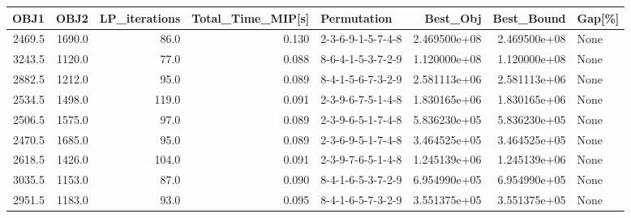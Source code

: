 \begin{tabular}{rrrrlrrl}
\toprule
   OBJ1 &    OBJ2 &  LP\_iterations &  Total\_Time\_MIP[s] &        Permutation &      Best\_Obj &    Best\_Bound & Gap[\%] \\
\midrule
 2469.5 &  1690.0 &           86.0 &              0.130 &  2-3-6-9-1-5-7-4-8 &  2.469500e+08 &  2.469500e+08 &   None \\
 3243.5 &  1120.0 &           77.0 &              0.088 &  8-6-4-1-5-3-7-2-9 &  1.120000e+08 &  1.120000e+08 &   None \\
 2882.5 &  1212.0 &           95.0 &              0.089 &  8-4-1-5-6-7-3-2-9 &  2.581113e+06 &  2.581113e+06 &   None \\
 2534.5 &  1498.0 &          119.0 &              0.091 &  2-3-9-6-7-5-1-4-8 &  1.830165e+06 &  1.830165e+06 &   None \\
 2506.5 &  1575.0 &           97.0 &              0.089 &  2-3-9-6-5-1-7-4-8 &  5.836230e+05 &  5.836230e+05 &   None \\
 2470.5 &  1685.0 &           95.0 &              0.089 &  2-3-6-9-5-1-7-4-8 &  3.464525e+05 &  3.464525e+05 &   None \\
 2618.5 &  1426.0 &          104.0 &              0.091 &  2-3-9-7-6-5-1-4-8 &  1.245139e+06 &  1.245139e+06 &   None \\
 3035.5 &  1153.0 &           87.0 &              0.090 &  8-4-1-6-5-3-7-2-9 &  6.954990e+05 &  6.954990e+05 &   None \\
 2951.5 &  1183.0 &           93.0 &              0.095 &  8-4-1-6-5-7-3-2-9 &  3.551375e+05 &  3.551375e+05 &   None \\
\bottomrule
\end{tabular}
